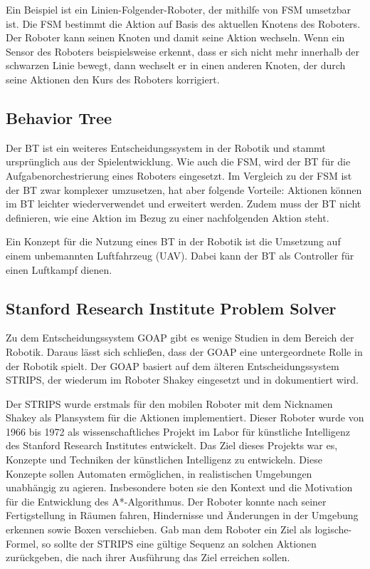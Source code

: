 Ein Beispiel ist ein Linien-Folgender-Roboter, der mithilfe von FSM umsetzbar ist. Die FSM bestimmt die Aktion auf Basis des aktuellen Knotens des Roboters. Der Roboter kann seinen Knoten und damit seine Aktion wechseln. Wenn ein Sensor des Roboters beispielsweise erkennt, dass er sich nicht mehr innerhalb der schwarzen Linie bewegt, dann wechselt er in einen anderen Knoten, der durch seine Aktionen den Kurs des Roboters korrigiert. \autocite{balogh2019using}

\subsection{Behavior Tree}
\label{chap:bt robotik}

Der BT ist ein weiteres Entscheidungssystem in der Robotik und stammt urspr\"{u}nglich aus der Spielentwicklung. Wie auch die FSM, wird der BT f\"{u}r die Aufgabenorchestrierung eines Roboters eingesetzt. Im Vergleich zu der FSM ist der BT zwar komplexer umzusetzen, hat aber folgende Vorteile: Aktionen k\"{o}nnen im BT leichter wiederverwendet und erweitert werden. Zudem muss der BT nicht definieren, wie eine Aktion im Bezug zu einer nachfolgenden Aktion steht. \autocite{iovino2022survey}

Ein Konzept f\"{u}r die Nutzung eines BT in der Robotik ist die Umsetzung auf einem unbemannten Luftfahrzeug (UAV). Dabei kann der BT als Controller f\"{u}r einen Luftkampf dienen. \autocite{btuav}

\subsection{Stanford Research Institute Problem Solver}
\label{chap:strips}

Zu dem Entscheidungssystem GOAP gibt es wenige Studien in dem Bereich der Robotik. Daraus l\"{a}sst sich schlie\ss{}en, dass der GOAP eine untergeordnete Rolle in der Robotik spielt. Der GOAP basiert auf dem \"{a}lteren Entscheidungssystem STRIPS, der wiederum im Roboter Shakey eingesetzt und in \autocite{nilsson1984shakey} dokumentiert wird.

Der STRIPS wurde erstmals f\"{u}r den mobilen Roboter mit dem Nicknamen Shakey als Plansystem f\"{u}r die Aktionen implementiert. Dieser Roboter wurde von 1966 bis 1972 als wissenschaftliches Projekt im Labor f\"{u}r k\"{u}nstliche Intelligenz des Stanford Research Institutes entwickelt. Das Ziel dieses Projekts war es, Konzepte und Techniken der k\"{u}nstlichen Intelligenz zu entwickeln. Diese Konzepte sollen Automaten erm\"{o}glichen, in realistischen Umgebungen unabh\"{a}ngig zu agieren. Insbesondere boten sie den Kontext und die Motivation f\"{u}r die Entwicklung des A*-Algorithmus. Der Roboter konnte nach seiner Fertigstellung in R\"{a}umen fahren, Hindernisse und \"{A}nderungen in der Umgebung erkennen sowie Boxen verschieben. Gab man dem Roboter ein Ziel als logische-Formel, so sollte der STRIPS eine g\"{u}ltige Sequenz an solchen Aktionen zur\"{u}ckgeben, die nach ihrer Ausf\"{u}hrung das Ziel erreichen sollen.

